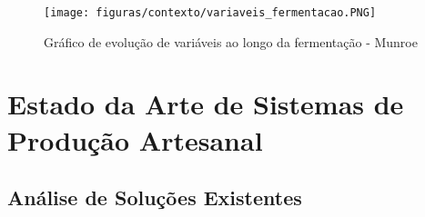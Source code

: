 \begin{figure}[H]
    \centering
    \texttt{[image: figuras/contexto/variaveis\_fermentacao.PNG]}
    \caption{Gráfico de evolução de variáveis ao longo da fermentação - Munroe \cite{FermentationMunroe} }
    \label{fig:variaveis_fermentacao}
\end{figure}

\section{Estado da Arte de Sistemas de Produção Artesanal}

\subsection{Análise de Soluções Existentes}

